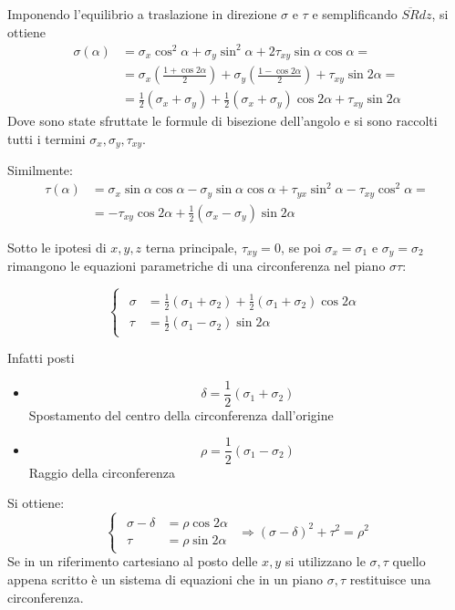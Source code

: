 \documentclass{article}
\begin{document}
\begin{adjustwidth}{2in}{}
	Imponendo l'equilibrio a traslazione in direzione $\sigma$ e $\tau$ e semplificando $\overline{SR}dz$, si ottiene
	\[
	\begin{split}
		\sigma(\alpha) & = \sigma_x \cos^2 \alpha + \sigma_y \sin^2 \alpha + 2\tau_{xy} \sin\alpha \cos\alpha = \\
					   & = \sigma_x\left( \frac{1+ \cos2\alpha}{2}\right)  + \sigma_y \left( \frac{1- \cos2\alpha}{2}\right) + \tau_{xy} \sin2\alpha = \\
					   & = \frac{1}{2} (\sigma_x + \sigma_y) + \frac{1}{2}  (\sigma_x + \sigma_y) \cos2\alpha + \tau_{xy} \sin2\alpha
	\end{split}
	\]
	Dove sono state sfruttate le formule di bisezione dell'angolo e si sono raccolti tutti i termini $\sigma_x, \sigma_y, \tau_{xy}$. 
	
	Similmente:
	\[
	\begin{split}
		\tau(\alpha) & = \sigma_x \sin\alpha\cos\alpha - \sigma_y \sin\alpha\cos\alpha + \tau_{yx} \sin^2\alpha - \tau_{xy} \cos^2\alpha = \\
					   & = -\tau_{xy} \cos2\alpha + \frac{1}{2} (\sigma_x - \sigma_y) \sin2\alpha
	\end{split}
	\]
	
	Sotto le ipotesi di $x,y,z$ terna principale, $\tau_{xy} = 0$, se poi $\sigma_x=\sigma_1$ e $\sigma_y=\sigma_2$ rimangono le equazioni
	parametriche di una circonferenza nel piano $\sigma\tau$: 
	
	\[
	\begin{cases}
		\begin{aligned}
	\sigma & = \frac{1}{2} (\sigma_1 + \sigma_2) + \frac{1}{2}  (\sigma_1 + \sigma_2) \cos2\alpha \\
	\tau & = \frac{1}{2} (\sigma_1 - \sigma_2) \sin2\alpha
		\end{aligned}
	\end{cases}
	\]
	
	Infatti posti 
	\begin{itemize}
	\item	\[\delta = \frac{1}{2} (\sigma_1 + \sigma_2)\]
	Spostamento del centro della circonferenza dall'origine
	
	\item \[\rho = \frac{1}{2} (\sigma_1 - \sigma_2)\]
	Raggio della circonferenza
	\end{itemize}
	Si ottiene:
	\[
	\begin{cases}
		\begin{aligned}
			\sigma - \delta & = \rho \cos2\alpha \\
			\tau & = \rho \sin2\alpha
		\end{aligned}
	\end{cases} \Rightarrow (\sigma - \delta)^2 + \tau^2 = \rho^2
	\]
	Se in un riferimento cartesiano al posto delle $x,y$  si utilizzano le $\sigma,\tau$ quello appena scritto è un sistema di equazioni che in un piano $\sigma,\tau$ restituisce una circonferenza. \newline
	

\end{adjustwidth}
\end{document}
